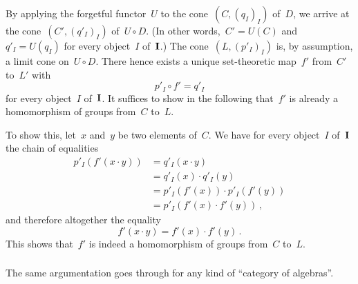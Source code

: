 By applying the forgetful functor~$U$ to the cone~$(C, (q_I)_I)$ of~$D$, we arrive at the cone~$(C', (q'_I)_I)$ of~$U ∘ D$.
(In other words,~$C' = U(C)$ and~$q'_I = U(q_I)$ for every object~$I$ of~$\mathbf{I}$.)
The cone~$(L, (p'_I)_I)$ is, by assumption, a limit cone on~$U ∘ D$.
There hence exists a unique set-theoretic map~$f'$ from~$C'$ to~$L'$ with
\[
	p'_I ∘ f' = q'_I
\]
for every object~$I$ of~$\mathbf{I}$.
It suffices to show in the following that~$f'$ is already a homomorphism of groups from~$C$ to~$L$.

To show this, let~$x$ and~$y$ be two elements of~$C$.
We have for every object~$I$ of~$\mathbf{I}$ the chain of equalities
\begin{align*}
	p'_I( f'(x ⋅ y) )
	&=
	q'_I( x ⋅ y )
	\\
	&=
	q'_I(x) ⋅ q'_I(y)
	\\
	&=
	p'_I( f'(x) ) ⋅ p'_I( f'(y) )
	\\
	&=
	p'_I( f'(x) ⋅ f'(y) ) \,,
\end{align*}
and therefore altogether the equality
\[
	f'(x ⋅ y) = f'(x) ⋅ f'(y) \,.
\]
This shows that~$f'$ is indeed a homomorphism of groups from~$C$ to~$L$.



\subsubsection{}

The same argumentation goes through for any kind of \enquote{category of algebras}.

